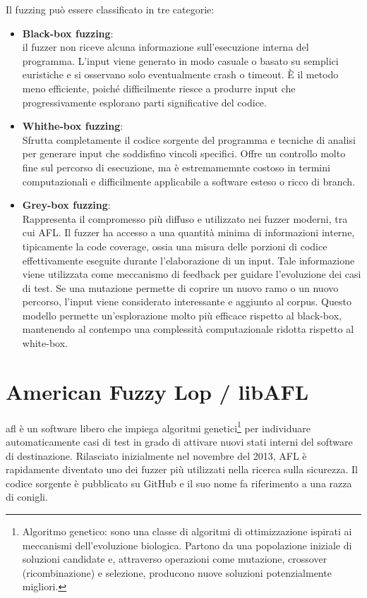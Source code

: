 Il fuzzing può essere classificato in tre categorie:
\begin{itemize}
    \item \textbf{Black-box fuzzing}: \\ il fuzzer non riceve alcuna informazione sull'esecuzione interna del programma.
    L'input viene generato in modo casuale o basato su semplici euristiche e si osservano solo eventualmente crash o timeout.
    È il metodo meno efficiente, poiché difficilmente riesce a produrre input che progressivamente esplorano parti significative del codice.
    
    \item \textbf{Whithe-box fuzzing}: \\ Sfrutta completamente il codice sorgente del programma e tecniche di analisi per generare input che soddisfino vincoli specifici.
    Offre un controllo molto fine sul percorso di esecuzione, ma è estremamemnte costoso in termini computazionali e difficilmente applicabile a software esteso o ricco di branch.

    
    \item \textbf{Grey-box fuzzing}:\\Rappresenta il compromesso più diffuso e utilizzato nei fuzzer moderni, tra cui AFL. Il fuzzer ha accesso a una quantità minima di informazioni interne, tipicamente la code coverage, ossia una misura delle porzioni di codice effettivamente eseguite durante l'elaborazione di un input. Tale informazione viene utilizzata come meccanismo di feedback per guidare l’evoluzione dei casi di test. Se una mutazione permette di coprire un nuovo ramo o un nuovo percorso, l’input viene considerato interessante e aggiunto al corpus. Questo modello permette un’esplorazione molto più efficace rispetto al black-box, mantenendo al contempo una complessità computazionale ridotta rispetto al white-box.

\newpage
    
\end{itemize}

\section{American Fuzzy Lop / libAFL}
\gls{afl} è un software libero che impiega algoritmi genetici\footnote{Algoritmo genetico: sono una classe di algoritmi di ottimizzazione ispirati ai meccanismi dell’evoluzione biologica. Partono da una popolazione iniziale di soluzioni candidate e, attraverso operazioni come mutazione, crossover (ricombinazione) e selezione, producono nuove soluzioni potenzialmente migliori.} per individuare automaticamente casi di test in grado di attivare nuovi stati interni del software di destinazione.
Rilasciato inizialmente nel novembre del 2013, AFL è rapidamente diventato uno dei fuzzer più utilizzati nella ricerca sulla sicurezza.
Il codice sorgente è pubblicato su GitHub e il suo nome fa riferimento a una razza di conigli.

